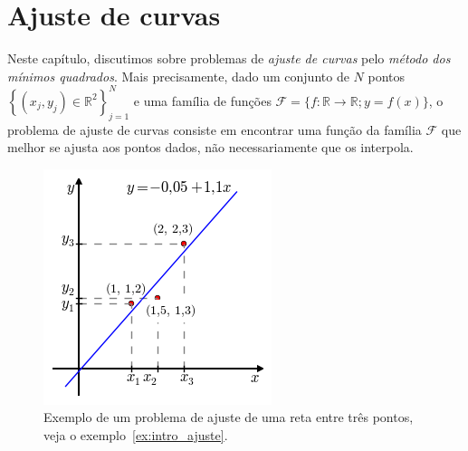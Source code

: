 
%

\chapter{Ajuste de curvas}

Neste capítulo, discutimos sobre problemas de \emph{ajuste de curvas} pelo \emph{método dos mínimos quadrados}. Mais precisamente, dado um conjunto de $N$ pontos $\left\{(x_j, y_j)\in \mathbb{R}^2\right\}_{j=1}^N$ e uma família de funções $\mathcal{F} = \{f:\mathbb{R}\to\mathbb{R}; y = f(x)\}$, o problema de ajuste de curvas consiste em encontrar uma função da família $\mathcal{F}$ que melhor se ajusta aos pontos dados, não necessariamente que os interpola. 

\begin{figure}[h!]
  \centering
  \includegraphics[scale=0.9]{./cap_ajuste/pics/ex_intro_ajuste/ex_intro_ajuste}
  \caption{Exemplo de um problema de ajuste de uma reta entre três pontos, veja o exemplo~\ref{ex:intro_ajuste}.}
  \label{fig:ex_intro}
\end{figure}

